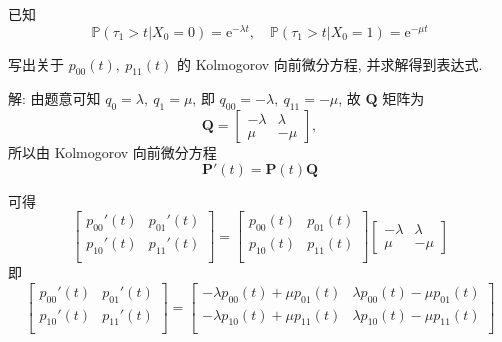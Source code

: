 \documentclass[openany]{ctexbook}
\theoremstyle{kaiti}
\theoremstyle{normal}
\begin{document}
已知
\begin{equation}
  \mathbb{P}(\tau_1>t|X_0=0)=\mathrm{e}^{-\lambda t},\quad \mathbb{P}(\tau_1>t|X_0=1)=\mathrm{e}^{-\mu t}
\end{equation}

写出关于 $p_{00}(t),~p_{11}(t)$ 的 Kolmogorov 向前微分方程, 并求解得到表达式.

解: 由题意可知 $q_0=\lambda,~q_1=\mu$, 即 $q_{00}=-\lambda,~q_{11}=-\mu$, 故 $\bm{Q}$ 矩阵为
\begin{equation}
  \bm{Q}=
  \begin{bmatrix}
    -\lambda & \lambda \\
    \mu & -\mu
  \end{bmatrix},
\end{equation}
所以由 Kolmogorov 向前微分方程
\begin{equation}
  \bm{P}'(t)=\bm{P}(t)\bm{Q}
\end{equation}

可得
\begin{equation}
  \begin{bmatrix}
    p_{00}'(t) & p_{01}'(t) \\
    p_{10}'(t) & p_{11}'(t) \\
  \end{bmatrix}
  =\begin{bmatrix}
    p_{00}(t) & p_{01}(t) \\
    p_{10}(t) & p_{11}(t) \\
  \end{bmatrix}
  \begin{bmatrix}
    -\lambda & \lambda \\
    \mu & -\mu
  \end{bmatrix}
\end{equation}
即
\begin{equation}
  \begin{bmatrix}
    p_{00}'(t) & p_{01}'(t) \\
    p_{10}'(t) & p_{11}'(t) \\
  \end{bmatrix}
  =\begin{bmatrix}
    -\lambda p_{00}(t)+\mu p_{01}(t) & \lambda p_{00}(t)-\mu p_{01}(t) \\
    -\lambda p_{10}(t)+\mu p_{11}(t) & \lambda p_{10}(t)-\mu p_{11}(t) \\
  \end{bmatrix}
\end{equation}
\end{document}
